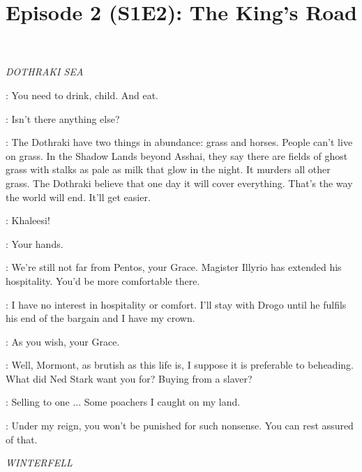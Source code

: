 

\title{Episode 2 (S1E2): The King's Road}
\author{}
\date{}
\maketitle



\scene

\textit{DOTHRAKI SEA}


\JORAH: You need to drink, child. And eat. 

\DAENERYS: Isn't there anything else? 

\JORAH: The Dothraki have two things in abundance: grass and horses. People can't live on grass. In the Shadow Lands beyond Asshai, they say there are fields of ghost grass with stalks as pale as milk that glow in the night. It murders all other grass. The Dothraki believe that one day it will cover everything. That's the way the world will end. It'll get easier. 


\DOREAH: Khaleesi! 

\IRRI: Your hands. 

\JORAH: We're still not far from Pentos, your Grace. Magister Illyrio has extended his hospitality. You'd be more comfortable there. 

\VISERYS: I have no interest in hospitality or comfort. I'll stay with Drogo until he fulfils his end of the bargain and I have my crown. 

\JORAH: As you wish, your Grace. 

\VISERYS: Well, Mormont, as brutish as this life is, I suppose it is preferable to beheading. What did Ned Stark want you for? Buying from a slaver? 

\JORAH: Selling to one $\ldots$ Some poachers I caught on my land. 

\VISERYS: Under my reign, you won't be punished for such nonsense. You can rest assured of that. 

\scene

\textit{WINTERFELL}


